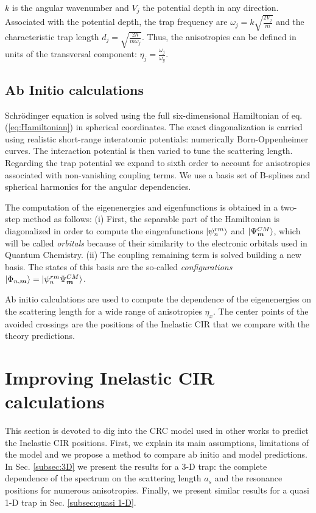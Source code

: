 \documentclass[aps,pre,twocolumn,superscriptaddress,showpacs]{revtex4-1}
\newcommand{\bfeq}[1]{{\boldsymbol{#1}}}
\begin{document}
		$k$ is the angular wavenumber and $V_j$ the potential depth in any direction. Associated with the potential depth, the trap frequency are 			$\omega_j = k\sqrt{\frac{2V_j}{m}}$ and the characteristic trap length $d_j = \sqrt{\frac{2\hbar}{m\omega_j}}$. Thus, the anisotropies can be 			defined in units of the transversal component: $\eta_j = \frac{\omega_j}{\omega_y}$.
	
	
	\subsection{Ab Initio calculations} \label{subsec:Ab_initio}
		Schrödinger equation is solved using the full six-dimensional Hamiltonian of eq.(\ref{eq:Hamiltonian}) in spherical coordinates. The exact 				diagonalization is carried using realistic short-range interatomic potentials: numerically Born-Oppenheimer curves. The interaction potential is then 		varied to tune the scattering length. Regarding the trap potential we expand to sixth order to account for anisotropies associated with non-vanishing 		coupling terms.  We use a basis set of B-splines and spherical harmonics for the angular dependencies. \cite{PhysRevA.84.062710}
		
		The computation of the eigenenergies and eigenfunctions is obtained in a two-step method as follows: (i) First, the separable part of the 				Hamiltonian is diagonalized in order to compute the eingenfunctions $\ket{\psi^{rm}_n}$ and $\ket{\Psi^{CM}_{\bfeq{m}}}$, which will be called 			\textit{orbitals} because of their similarity to the electronic orbitals used in Quantum Chemistry. (ii) The coupling remaining term is solved 				building a new basis. The states of this basis are the so-called \textit{configurations} $\ket{\Phi_{n, \bfeq{m}}} = \ket{\psi^{rm}_n \Psi^{CM}_{\bfeq{m}}}$. 
		
		Ab initio calculations are used to compute the dependence of the eigenenergies on the scattering length for a wide range of anisotropies $\eta_x$. 
		The center points of the avoided crossings are the positions of the Inelastic CIR that we compare with the theory predictions.
\section{Improving Inelastic CIR calculations}  \label{sec:theory}
	This section is devoted to dig into the CRC model used in other works to predict the Inelastic CIR positions. First, we explain its main assumptions, 		limitations of the model and we propose a method to compare ab initio and model predictions. In Sec. \ref{subsec:3D} we present the results for a 3-D 	trap: the complete dependence of the spectrum on the scattering length $a_s$ and the resonance positions for numerous anisotropies. Finally, we 		present similar results for a quasi 1-D trap in Sec. \ref{subsec:quasi 1-D}.
	
\end{document}
